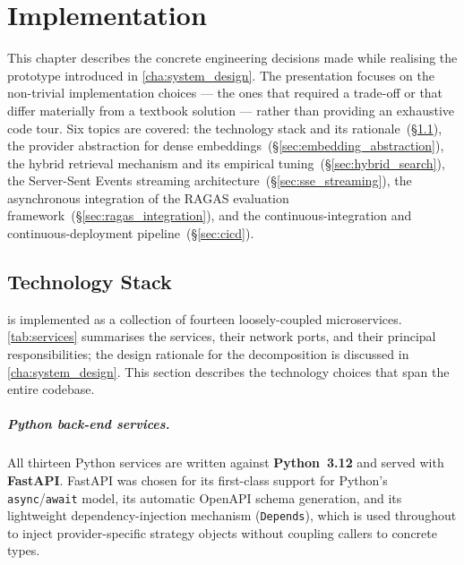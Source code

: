 \chapter{Implementation}
\label{cha:implementation}

This chapter describes the concrete engineering decisions made while realising
the \medrag{} prototype introduced in \cref{cha:system_design}.  The
presentation focuses on the non-trivial implementation choices — the ones that
required a trade-off or that differ materially from a textbook solution — rather
than providing an exhaustive code tour.  Six topics are covered: the technology
stack and its rationale~(\S\ref{sec:tech_stack}), the provider abstraction for
dense embeddings~(\S\ref{sec:embedding_abstraction}), the hybrid retrieval
mechanism and its empirical tuning~(\S\ref{sec:hybrid_search}), the
Server-Sent Events streaming architecture~(\S\ref{sec:sse_streaming}), the
asynchronous integration of the RAGAS evaluation
framework~(\S\ref{sec:ragas_integration}), and the continuous-integration
and continuous-deployment pipeline~(\S\ref{sec:cicd}).

\section{Technology Stack}
\label{sec:tech_stack}

\medrag{} is implemented as a collection of fourteen loosely-coupled
microservices.  \cref{tab:services} summarises the services, their
network ports, and their principal responsibilities; the design rationale for
the decomposition is discussed in \cref{cha:system_design}.  This
section describes the technology choices that span the entire codebase.

\paragraph{Python back-end services.}
All thirteen Python services are written against \textbf{Python~3.12} and
served with \textbf{FastAPI}.  FastAPI was chosen for its
first-class support for Python's \texttt{async}/\texttt{await} model, its
automatic OpenAPI schema generation, and its lightweight dependency-injection
mechanism (\texttt{Depends}), which is used throughout to inject
provider-specific strategy objects without coupling callers to concrete types.

